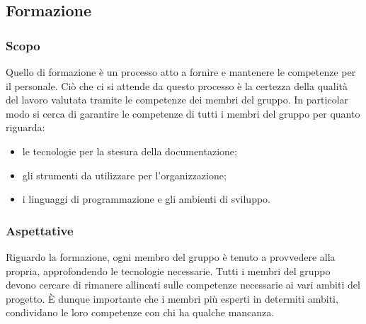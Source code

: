 \subsection{Formazione}
\subsubsection{Scopo}
Quello di formazione è un processo atto a fornire e mantenere le competenze per il personale. Ciò che ci si 
attende da questo processo è la certezza della qualità del lavoro valutata tramite le competenze dei membri 
del gruppo. In particolar modo si cerca di garantire le competenze di tutti i membri del gruppo per quanto 
riguarda:
\begin{itemize}
	\item le tecnologie per la stesura della documentazione;
	\item gli strumenti da utilizzare per l'organizzazione;
	\item i linguaggi di programmazione e gli ambienti di sviluppo.
\end{itemize}
\subsubsection{Aspettative}
Riguardo la formazione, ogni membro del gruppo è tenuto a provvedere alla propria, approfondendo le tecnologie 
necessarie. Tutti i membri del gruppo devono cercare di rimanere allineati sulle competenze necessarie ai vari 
ambiti del progetto. È dunque importante che i membri più esperti in determiti ambiti, condividano le loro 
competenze con chi ha qualche mancanza.

